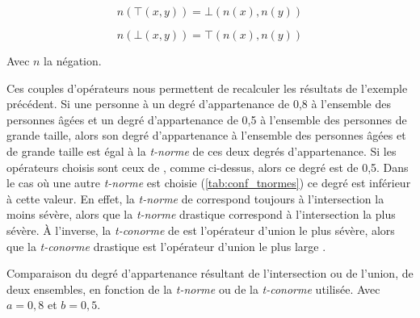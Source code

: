 \begin{equation}
  n(⊤(x,y)) = ⊥(n(x), n(y))
\end{equation}

\begin{equation}
  n(⊥(x,y)) = ⊤(n(x), n(y))
\end{equation}

Avec \(n\) la négation.

Ces couples d'opérateurs nous permettent de recalculer les résultats
de l'exemple précédent. Si une personne à un degré d'appartenance de
0,8 à l'ensemble des personnes âgées et un degré d'appartenance de 0,5
à l'ensemble des personnes de grande taille, alors son degré
d'appartenance à l'ensemble des personnes âgées et de grande taille
est égal à la \emph{t-norme} de ces deux degrés d'appartenance. Si les
opérateurs choisis sont ceux de \textcite{Zadeh1965}, comme ci-dessus,
alors ce degré est de 0,5. Dans le cas où une autre \emph{t-norme} est
choisie (\autoref{tab:conf_tnormes}) ce degré est inférieur à cette
valeur. En effet, la \emph{t-norme} de \textcite{Zadeh1965} correspond
toujours à l'intersection la moins sévère, alors que la \emph{t-norme}
drastique correspond à l'intersection la plus sévère. À l'inverse, la
\emph{t-conorme} de \textcite{Zadeh1965} est l'opérateur d'union le
plus sévère, alors que la \emph{t-conorme} drastique est l'opérateur
d'union le plus large \autocite{Bouchon-Meunier2007}.

\begin{table}
  \centering
  
  \caption{Comparaison du degré d'appartenance résultant de
    l'intersection ou de l'union, de deux ensembles, en fonction de la
    \emph{t-norme} ou de la \emph{t-conorme} utilisée. Avec
    \(a = 0,8\) et \(b = 0,5\).}
  \label{tab:conf_tnormes}
\end{table}

